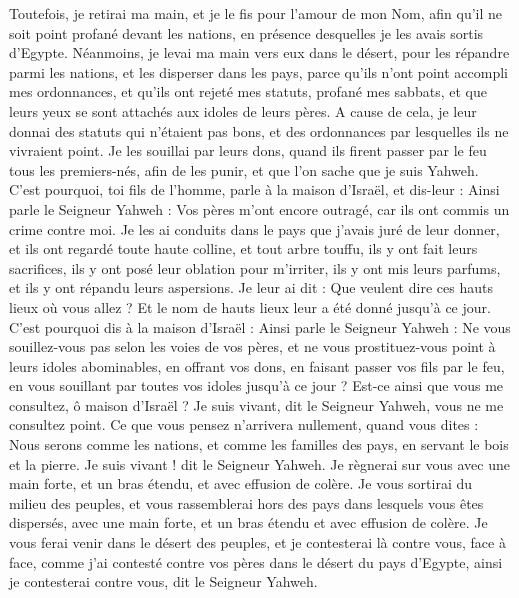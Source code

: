 \begin{multicols}{2}
Toutefois, je retirai ma main, et je le fis pour l'amour de mon Nom, afin qu'il ne soit point profané devant les nations, en présence desquelles je les avais sortis d'Egypte.
Néanmoins, je levai ma main vers eux dans le désert, pour les répandre parmi les nations, et les disperser dans les pays,
parce qu'ils n'ont point accompli mes ordonnances, et qu'ils ont rejeté mes statuts, profané mes sabbats, et que leurs yeux se sont attachés aux idoles de leurs pères.
A cause de cela, je leur donnai des statuts qui n'étaient pas bons, et des ordonnances par lesquelles ils ne vivraient point.
Je les souillai par leurs dons, quand ils firent passer par le feu tous les premiers-nés, afin de les punir, et que l'on sache que je suis Yahweh.
C'est pourquoi, toi fils de l’homme, parle à la maison d'Israël, et dis-leur : Ainsi parle le Seigneur Yahweh : Vos pères m'ont encore outragé, car ils ont commis un crime contre moi.
Je les ai conduits dans le pays que j’avais juré de leur donner, et ils ont regardé toute haute colline, et tout arbre touffu, ils y ont fait leurs sacrifices, ils y ont posé leur oblation pour m'irriter, ils y ont mis leurs parfums, et ils y ont répandu leurs aspersions.
Je leur ai dit : Que veulent dire ces hauts lieux où vous allez ? Et le nom de hauts lieux leur a été donné jusqu'à ce jour.
C'est pourquoi dis à la maison d'Israël : Ainsi parle le Seigneur Yahweh : Ne vous souillez-vous pas selon les voies de vos pères, et ne vous prostituez-vous point à leurs idoles abominables,
en offrant vos dons, en faisant passer vos fils par le feu, en vous souillant par toutes vos idoles jusqu'à ce jour ? Est-ce ainsi que vous me consultez, ô maison d'Israël ? Je suis vivant, dit le Seigneur Yahweh, vous ne me consultez point.
Ce que vous pensez n'arrivera nullement, quand vous dites : Nous serons comme les nations, et comme les familles des pays, en servant le bois et la pierre.
Je suis vivant ! dit le Seigneur Yahweh. Je règnerai sur vous avec une main forte, et un bras étendu, et avec effusion de colère.
Je vous sortirai du milieu des peuples, et vous rassemblerai hors des pays dans lesquels vous êtes dispersés, avec une main forte, et un bras étendu et avec effusion de colère.
Je vous ferai venir dans le désert des peuples, et je contesterai là contre vous, face à face,
comme j'ai contesté contre vos pères dans le désert du pays d'Egypte, ainsi je contesterai contre vous, dit le Seigneur Yahweh.

\end{multicols}
